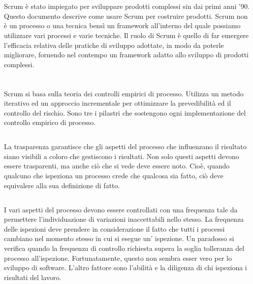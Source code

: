 \newpage
\section*{\color{Blue}{LO SCOPO}}
\label{sec:purpose}
Scrum \`e stato impiegato per sviluppare prodotti complessi sin dai primi anni '90. Questo documento descrive come usare
Scrum per costruire prodotti. Scrum non \`e un processo o una tecnica bens\`i un framework all'interno del quale
possiamo utilizzare vari processi e varie tecniche. Il ruolo di Scrum \`e quello di far emergere l'efficacia relativa
delle pratiche di sviluppo adottate, in modo da poterle migliorare, fornendo nel contempo un framework adatto allo
sviluppo di prodotti complessi.

\section*{\color{Blue}{LA TEORIA  DI SCRUM}}
\label{sec:scrum_theory}
Scrum si basa sulla teoria dei controlli empirici di processo. Utilizza un metodo iterativo ed un approccio incrementale
per ottimizzare la prevedibilit\`a ed il controllo del rischio. Sono tre i pilastri che sostengono ogni implementazione
del controllo empirico di processo.

\subsection*{\color{Blue}{LA PRIMA  COLONNA  \`E LA TRASPARENZA}}
\label{sec:transparency}
La trasparenza garantisce che gli aspetti del processo che influenzano il risultato siano visibili a coloro che
gestiscono i risultati. Non solo questi aspetti devono essere trasparenti, ma anche ci\`o che si vede deve essere noto.
Cio\`e, quando qualcuno che ispeziona un processo crede che qualcosa sia fatto, ci\`o deve equivalere alla sua
definizione di fatto.

\subsection*{\color{Blue}{LA  SECONDA  COLONNA \`E  L'ISPEZIONE}}
\label{sec:inspection}
I vari aspetti del processo devono essere controllati con una frequenza tale da permettere l'individuazione di
variazioni inaccettabili nello stesso. La frequenza delle ispezioni deve prendere in considerazione il fatto che tutti i
processi cambiano nel momento stesso in cui si esegue un' ispezione. Un paradosso si verifica quando la frequenza di
controllo richiesta supera la soglia tolleranza del processo all'ispezione. Fortunatamente, questo non sembra esser vero
per lo sviluppo di software. L'altro fattore sono l'abilit\`a e la diligenza di chi ispeziona i risultati del lavoro.

